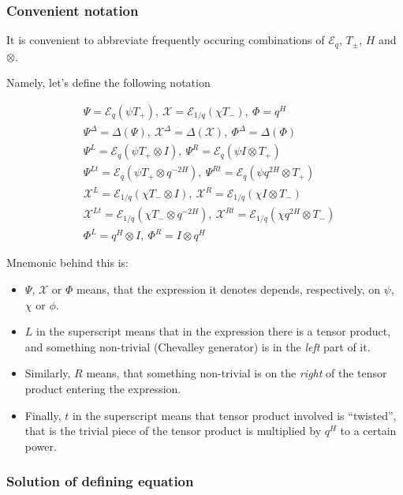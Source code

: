 \documentclass{article}
\newcommand{\lb}{\left (}
\newcommand{\rb}{\right )}
\newcommand{\B}[1]{\lb #1 \rb}
\newcommand{\be}{\begin{eqnarray}}
\newcommand{\ee}{\end{eqnarray}}
\newcommand {\?}{\textit{???}}
\newcommand{\me}[0]{\mathcal{E}}
\newcommand{\Tp}[1][]{T_{+ #1}}
\newcommand{\Tm}[1][]{T_{- #1}}
\def\Chi{\mathcal{X}}
\newcommand{\EChiL}[1][]{\Chi^L_{#1}}
\newcommand{\EChiR}[1][]{\Chi^R_{#1}}
\newcommand{\EChiLT}[1][]{\Chi^{Lt}_{#1}}
\newcommand{\EChiRT}[1][]{\Chi^{Rt}_{#1}}
\newcommand{\EChiD}[1][]{\Chi^\Delta_{#1}}
\newcommand{\EPsiL}[1][]{\Psi^L_{#1}}
\newcommand{\EPsiR}[1][]{\Psi^R_{#1}}
\newcommand{\EPsiLT}[1][]{\Psi^{Lt}_{#1}}
\newcommand{\EPsiRT}[1][]{\Psi^{Rt}_{#1}}
\newcommand{\EPsiD}[1][]{\Psi^\Delta_{#1}}
\newcommand{\QPhiL}[1][]{\Phi^L_{#1}}
\newcommand{\QPhiR}[1][]{\Phi^R_{#1}}
\newcommand{\QPhiD}[1][]{\Phi^\Delta_{#1}}
\newcommand{\comul}[1]{\Delta \lb #1 \rb}
\begin{document}
\subsubsection{Convenient notation}

It is convenient to abbreviate frequently occuring combinations of $\me_q$, $T_\pm$, $H$ and $\otimes$.

Namely, let's define the following notation

\be
& \Psi = \me_q \B{\psi \Tp},\ \Chi = \me_{1/q} \B{\chi \Tm},\ \Phi = q^H \nonumber \\
& \EPsiD = \comul{\Psi},\ \EChiD = \comul{\Chi},\ \QPhiD = \comul{\Phi} \nonumber \\
& \EPsiL = \me_q \lb \psi T_+ \otimes I\rb,\ \EPsiR = \me_q \lb \psi I \otimes T_+ \rb \nonumber \\
\label{macrolanguage-sl2}
& \EPsiLT = \me_q \lb \psi T_+ \otimes q^{-2H}\rb,\ \EPsiRT = \me_q \lb \psi q^{2H} \otimes T_+ \rb \\
& \EChiL = \me_{1/q} \lb \chi T_- \otimes I\rb,\ \EChiR = \me_{1/q} \lb \chi I \otimes T_- \rb \nonumber \\
& \EChiLT = \me_{1/q} \lb \chi T_- \otimes q^{-2H}\rb,\ \EChiRT = \me_{1/q} \lb \chi q^{2H} \otimes T_- \rb \nonumber \\
& \QPhiL = q^H \otimes I,\ \QPhiR = I \otimes q^H \nonumber 
\ee

Mnemonic behind this is:
\begin{itemize}
\item $\Psi$, $\Chi$ or $\Phi$ means, that the expression it denotes depends, respectively,
on $\psi$, $\chi$ or $\phi$.
\item $L$ in the superscript means that in the expression there is a tensor product,
and something non-trivial (Chevalley generator) is in the {\it left} part of it.
\item Similarly, $R$ means, that something non-trivial is on the {\it right} of the tensor product entering the expression.
\item Finally, $t$ in the superscript means that tensor product involved is ``twisted'', that is the trivial piece
of the tensor product is multiplied by $q^H$ to a certain power.
\end{itemize}

\subsubsection{Solution of defining equation}
\end{document}
